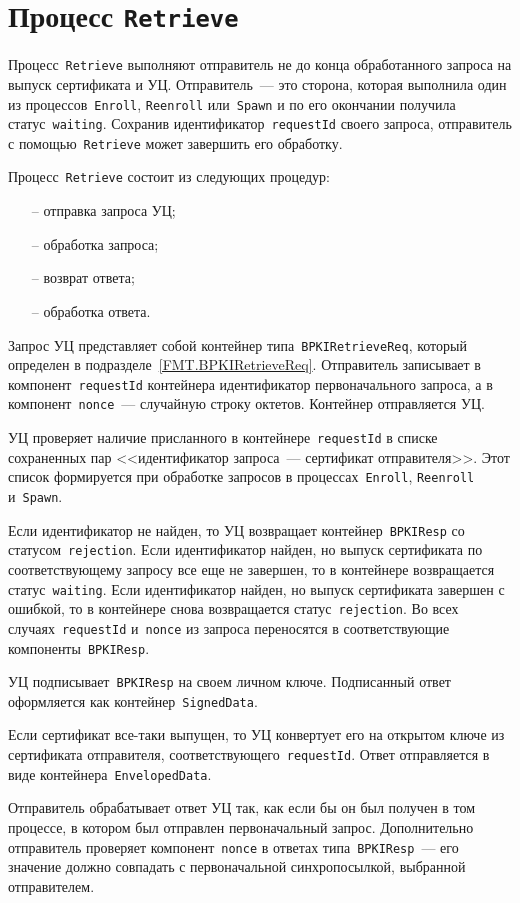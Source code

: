\section{Процесс \texttt{Retrieve}}\label{PROCESSES.Retrieve}

Процесс~\texttt{Retrieve} выполняют отправитель не до конца обработанного
запроса на выпуск сертификата и УЦ.  Отправитель~--- это сторона, которая 
выполнила один из процессов~\texttt{Enroll}, \texttt{Reenroll} 
или~\texttt{Spawn} и по его окончании получила статус~\texttt{waiting}. 
Сохранив идентификатор~\texttt{requestId} своего запроса, отправитель с 
помощью~\texttt{Retrieve} может завершить его обработку.

Процесс~\texttt{Retrieve} состоит из следующих процедур:
\begin{itemize}
\item[--]
отправка запроса УЦ;
\item[--]
обработка запроса;
\item[--]
возврат ответа;
\item[--]
обработка ответа.
\end{itemize}

Запрос УЦ представляет собой контейнер типа~\texttt{BPKIRetrieveReq},
который определен в подразделе~\ref{FMT.BPKIRetrieveReq}.
Отправитель записывает в компонент~\texttt{requestId} контейнера
идентификатор первоначального запроса, а в компонент~\texttt{nonce}~---
случайную строку октетов. Контейнер отправляется УЦ.

УЦ проверяет наличие присланного в контейнере~\texttt{requestId} в списке 
сохраненных пар <<идентификатор запроса~--- сертификат отправителя>>. Этот 
список формируется при обработке запросов в процессах~\texttt{Enroll}, 
\texttt{Reenroll} и~\texttt{Spawn}. 

Если идентификатор не найден, то УЦ возвращает контейнер~\texttt{BPKIResp}
со статусом~\texttt{rejection}. 
%
Если идентификатор найден, но выпуск сертификата по соответствующему 
запросу все еще не завершен, то в контейнере возвращается 
статус~\texttt{waiting}.  
%
Если идентификатор найден, но выпуск сертификата завершен с ошибкой,
то в контейнере снова возвращается статус~\texttt{rejection}. 
%
Во всех случаях~\texttt{requestId} и~\texttt{nonce} из запроса переносятся 
в соответствующие компоненты~\texttt{BPKIResp}. 

УЦ подписывает~\texttt{BPKIResp} на своем личном ключе. Подписанный ответ 
оформляется как контейнер~\texttt{SignedData}.

Если сертификат все-таки выпущен, то УЦ конвертует его 
на открытом ключе из сертификата отправителя, 
соответствующего~\texttt{requestId}. Ответ отправляется
в виде контейнера~\texttt{EnvelopedData}.

Отправитель обрабатывает ответ УЦ так, как если бы он был получен в 
том процессе, в котором был отправлен первоначальный запрос.
Дополнительно отправитель проверяет компонент~\texttt{nonce}
в ответах типа~\texttt{BPKIResp}~--- его значение должно совпадать 
с первоначальной синхропосылкой, выбранной отправителем.

